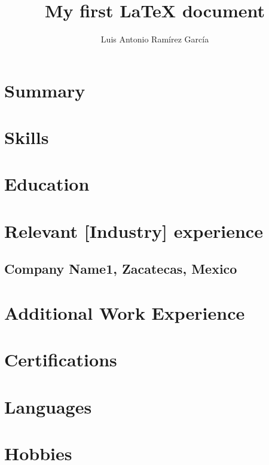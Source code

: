 \documentclass{article}
\author{Luis Antonio Ramírez García}
\title{My first {\LaTeX} document}
\begin{document}
  \maketitle

  \section{Summary}

  \section{Skills}

  \section{Education}

  \section{Relevant [Industry] experience}
  \subsection{Company Name1, Zacatecas, Mexico}

  \section{Additional Work Experience}

  \section{Certifications}

  \section{Languages}

  \section{Hobbies}
\end{document}

